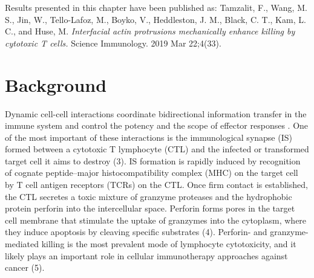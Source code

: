 Results presented in this chapter have been published as: Tamzalit, F., Wang, M. S., Jin, W., Tello-Lafoz, M., Boyko, V., Heddleston, J. M., Black, C. T., Kam, L. C., and Huse, M.  \textit{Interfacial actin protrusions mechanically enhance killing by cytotoxic T cells.} Science Immunology. 2019 Mar 22;4(33).

\section{Background}
Dynamic cell-cell interactions coordinate bidirectional information transfer in the immune system and control the potency and the scope of effector responses \cite{Batista2013}. One of the most important of these interactions is the immunological synapse (IS) formed between a cytotoxic T lymphocyte (CTL) and the infected or transformed target cell it aims to destroy \cite{Dustin2010} (3). IS formation is rapidly induced by recognition of cognate peptide–major histocompatibility complex (MHC) on the target cell by T cell antigen receptors (TCRs) on the CTL. Once firm contact is established, the CTL secretes a toxic mixture of granzyme proteases and the hydrophobic protein perforin into the intercellular space. Perforin forms pores in the target cell membrane that stimulate the uptake of granzymes into the cytoplasm, where they induce apoptosis by cleaving specific substrates (4). Perforin- and granzyme- mediated killing is the most prevalent mode of lymphocyte cytotoxicity, and it likely plays an important role in cellular immunotherapy approaches against cancer (5).

